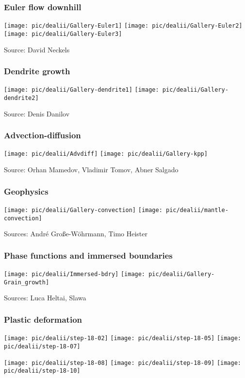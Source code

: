 

\begin{frame}
  \frametitle{Euler flow downhill}
  \begin{center}
    \texttt{[image: pic/dealii/Gallery-Euler1]}
    \texttt{[image: pic/dealii/Gallery-Euler2]}
    \texttt{[image: pic/dealii/Gallery-Euler3]}
  \end{center}
  
  Source: David Neckels
\end{frame}

\begin{frame}
  \frametitle{Dendrite growth}
  \begin{center}
    \texttt{[image: pic/dealii/Gallery-dendrite1]}
    \texttt{[image: pic/dealii/Gallery-dendrite2]}
  \end{center}

  Source: Denis Danilov
\end{frame}

\begin{frame}
  \frametitle{Advection-diffusion}
  \begin{center}
    \texttt{[image: pic/dealii/Advdiff]}
    \texttt{[image: pic/dealii/Gallery-kpp]}
  \end{center}
  
  Source: Orhan Mamedov, Vladimir Tomov, Abner Salgado
\end{frame}

\begin{frame}
  \frametitle{Geophysics}
  \begin{center}
    \texttt{[image: pic/dealii/Gallery-convection]}
    \texttt{[image: pic/dealii/mantle-convection]}
  \end{center}

  Sources: André Große-Wöhrmann, Timo Heister
\end{frame}

\begin{frame}
  \frametitle{Phase functions and immersed boundaries}
  \begin{center}
    \texttt{[image: pic/dealii/Immersed-bdry]}
    \texttt{[image: pic/dealii/Gallery-Grain\_growth]}
  \end{center}

  Sources: Luca Heltai, Slawa
\end{frame}

\begin{frame}
  \frametitle{Plastic deformation}
  \texttt{[image: pic/dealii/step-18-02]}
  \texttt{[image: pic/dealii/step-18-05]}
  \texttt{[image: pic/dealii/step-18-07]}

  \texttt{[image: pic/dealii/step-18-08]}
  \texttt{[image: pic/dealii/step-18-09]}
  \texttt{[image: pic/dealii/step-18-10]}
\end{frame}

